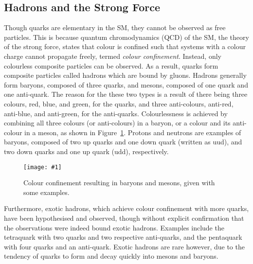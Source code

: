 \documentclass[twocolumn]{article}
\newcommand{\insertFigure}[1]{%
   \texttt{[image: \#1]}%
}
\begin{document}
\subsection{Hadrons and the Strong Force}\label{sec:hadrons}
Though quarks are elementary in the SM, they cannot be observed as free particles. This is because quantum chromodynamics (QCD) of the SM, the theory of the strong force, states that colour is confined such that systems with a colour charge cannot propagate freely, termed \textit{colour confinement}. Instead, only colourless composite particles can be observed. As a result, quarks form composite particles called hadrons which are bound by gluons. Hadrons generally form baryons, composed of three quarks, and mesons, composed of one quark and one anti-quark. The reason for the these two types is a result of there being three colours, red, blue, and green, for the quarks, and three anti-colours, anti-red, anti-blue, and anti-green, for the anti-quarks. Colourlessness is achieved by combining all three colours (or anti-colours) in a baryon, or a colour and its anti-colour in a meson, as shown in Figure~\ref{fig:colour}. Protons and neutrons are examples of baryons, composed of two up quarks and one down quark (written as uud), and two down quarks and one up quark (udd), respectively.
\begin{figure}[!h]
	\centering
	\insertFigure{colour.png}
	\caption{Colour confinement resulting in baryons and mesons, given with some examples.~\cite{colour}}
	\label{fig:colour}
\end{figure}
Furthermore, exotic hadrons, which achieve colour confinement with more quarks, have been hypothesised and observed, though without explicit confirmation that the observations were indeed bound exotic hadrons. Examples include the tetraquark with two quarks and two respective anti-quarks, and the pentaquark with four quarks and an anti-quark. Exotic hadrons are rare however, due to the tendency of quarks to form and decay quickly into mesons and baryons.
\end{document}
